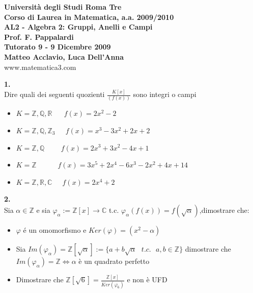 \documentclass[italian,a4paper,11pt]
{article}
\newcommand{\Q}{\mathbb{Q}}
\newcommand{\Z}{\mathbb Z}
\newcommand{\R}{\mathbb{R}}
\newcommand{\C}{\mathbb{C}}
\newcommand{\acc}{\`}
\begin{document}
\begin{center}

\textbf{Universit\`a degli Studi Roma Tre}\\

\textbf{Corso di Laurea in Matematica, a.a. 2009/2010}\\

\textbf{AL2 - Algebra 2: Gruppi, Anelli e Campi}\\

\textbf{Prof. F. Pappalardi}\\

\textbf{Tutorato 9 - 9 Dicembre 2009}\\

\textbf{Matteo Acclavio, Luca Dell'Anna}\\

www.matematica3.com\\
\end{center}



\vspace{0.4cm}


\vspace{0.4 cm}
\noindent
\begin{Ex}\textbf{ 1.}\\
Dire quali dei seguenti quozienti $\frac{K[x]}{(f(x))}$ sono integri o campi
\begin{itemize}
\item $K=\Z, \Q, \R$						$\ \ \ \ \ \ f(x)=2x^2-2$
\item $K=\Z, \Q, \Z_3$ 					$\ \ \ \ \ f(x)=x^3-3x^2+2x+2$
\item $K=\Z, \Q$ 								$\ \ \ \ \ \ \ \ \ f(x)=2x^3+3x^2-4x+1$
\item $K=\Z$										$\ \ \ \ \ \ \ \ \ \ \ \ f(x)=3x^5+2x^4-6x^3-2x^2+4x+14$
\item $K=\Z, \R, \C$ 						$\ \ \ \ \ f(x)=2x^4+2$
\end{itemize}
\end{Ex}


\vspace{0.4 cm}
\noindent
\begin{Ex}\textbf{ 2.}\\
Sia $\alpha\in \Z$ e sia $\varphi_{\alpha}:=\Z[x] \longrightarrow \C$ t.c. $\varphi_{\alpha}(f(x))= f(\sqrt{\alpha})$,dimostrare che:
\begin{itemize}
\item $\varphi$ \'e un omomorfismo e $Ker(\varphi)=(x^2-\alpha)$
\item Sia $Im(\varphi_{\alpha})=\Z[\sqrt{\alpha}]:=\{a+b\sqrt{\alpha}\ \ \  t.c. \ \ \  a,b\in \Z\}$ dimostrare che $Im(\varphi_{\alpha})=\Z \iff \alpha$ \acc e un quadrato perfetto
\item Dimostrare che $\Z[\sqrt{6}]=\frac{\Z[x]}{Ker(\varphi_{6})}$ e non \acc e UFD
\end{itemize}
\end{Ex}
\end{document}
